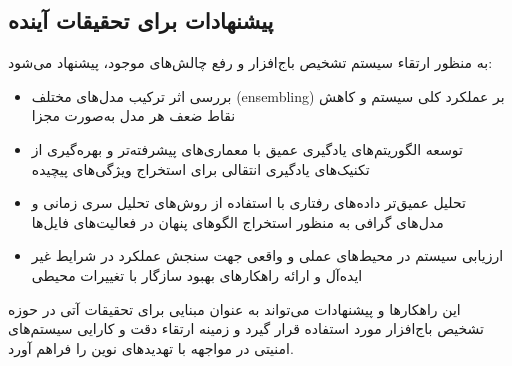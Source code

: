 \subsection{پیشنهادات برای تحقیقات آینده}
به منظور ارتقاء سیستم تشخیص باج‌افزار و رفع چالش‌های موجود، پیشنهاد می‌شود:
\begin{itemize}
    \item بررسی اثر ترکیب مدل‌های مختلف (ensembling) بر عملکرد کلی سیستم و کاهش نقاط ضعف هر مدل به‌صورت مجزا
    \item توسعه الگوریتم‌های یادگیری عمیق با معماری‌های پیشرفته‌تر و بهره‌گیری از تکنیک‌های یادگیری انتقالی برای استخراج ویژگی‌های پیچیده
    \item تحلیل عمیق‌تر داده‌های رفتاری با استفاده از روش‌های تحلیل سری زمانی و مدل‌های گرافی به منظور استخراج الگوهای پنهان در فعالیت‌های فایل‌ها
    \item ارزیابی سیستم در محیط‌های عملی و واقعی جهت سنجش عملکرد در شرایط غیر ایده‌آل و ارائه راهکارهای بهبود سازگار با تغییرات محیطی
\end{itemize}

این راهکارها و پیشنهادات می‌تواند به عنوان مبنایی برای تحقیقات آتی در حوزه تشخیص باج‌افزار مورد استفاده قرار گیرد و زمینه ارتقاء دقت و کارایی سیستم‌های امنیتی در مواجهه با تهدیدهای نوین را فراهم آورد.
